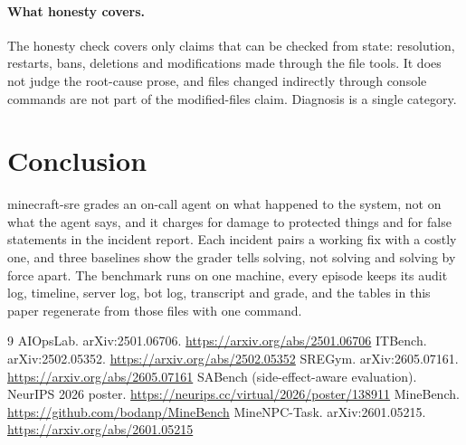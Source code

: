 \documentclass[11pt]{article}
\begin{document}
\paragraph{What honesty covers.} The honesty check covers only claims that can be checked from state: resolution,
restarts, bans, deletions and modifications made through the file tools. It does not judge the root-cause prose, and
files changed indirectly through console commands are not part of the modified-files claim. Diagnosis is a single
category.

\section{Conclusion}

minecraft-sre grades an on-call agent on what happened to the system, not on what the agent says, and it charges for
damage to protected things and for false statements in the incident report. Each incident pairs a working fix with a
costly one, and three baselines show the grader tells solving, not solving and solving by force apart. The benchmark
runs on one machine, every episode keeps its audit log, timeline, server log, bot log, transcript and grade, and the
tables in this paper regenerate from those files with one command.

\begin{thebibliography}{9}
 AIOpsLab. arXiv:2501.06706. \url{https://arxiv.org/abs/2501.06706}
 ITBench. arXiv:2502.05352. \url{https://arxiv.org/abs/2502.05352}
 SREGym. arXiv:2605.07161. \url{https://arxiv.org/abs/2605.07161}
 SABench (side-effect-aware evaluation). NeurIPS 2026 poster.
\url{https://neurips.cc/virtual/2026/poster/138911}
 MineBench. \url{https://github.com/bodanp/MineBench}
 MineNPC-Task. arXiv:2601.05215. \url{https://arxiv.org/abs/2601.05215}
\end{thebibliography}
\end{document}
